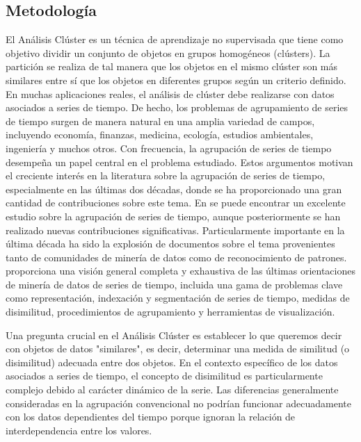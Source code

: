 \documentclass[10pt,a4paper]{article}
\begin{document}
\subsection{Metodología}
El Análisis Clúster es un técnica de aprendizaje no supervisada que tiene como objetivo dividir un conjunto de objetos en grupos homogéneos (clústers). La partición se realiza de tal manera que los objetos en el mismo clúster son más similares entre sí que los objetos en diferentes grupos según un criterio definido. En muchas aplicaciones reales, el análisis de clúster debe realizarse con datos asociados a  series de tiempo. De hecho, los problemas de agrupamiento de series de tiempo surgen de manera natural en una amplia variedad de campos, incluyendo economía, finanzas, medicina, ecología, estudios ambientales, ingeniería y muchos otros. 
Con frecuencia, la agrupación de series de tiempo desempeña un papel central en el problema estudiado. Estos argumentos motivan el creciente interés en la literatura sobre la agrupación de series de tiempo, especialmente en las últimas dos décadas, donde se ha proporcionado una gran cantidad de contribuciones sobre este tema. En \cite{liao2005clustering} se puede encontrar un excelente estudio sobre la agrupación de series de tiempo, aunque posteriormente se han realizado nuevas contribuciones significativas. Particularmente importante en la última década ha sido la explosión de documentos sobre el tema provenientes tanto de comunidades de minería de datos como de reconocimiento de patrones. \cite{fu2011review} proporciona una visión general completa y exhaustiva de las últimas orientaciones de minería de datos de series de tiempo, incluida una gama de problemas clave como representación, indexación y segmentación de series de tiempo, medidas de disimilitud, procedimientos de agrupamiento y herramientas de visualización.

Una pregunta crucial en el Análisis Clúster es establecer lo que queremos decir con objetos de datos "similares", es decir, determinar una medida de similitud (o disimilitud) adecuada entre dos objetos. En el contexto específico de los datos asociados a series de tiempo, el concepto de disimilitud es particularmente complejo debido al carácter dinámico de la serie. Las diferencias generalmente consideradas en la agrupación convencional no podrían funcionar adecuadamente con los datos dependientes del tiempo porque ignoran la relación de interdependencia entre los valores. 
\end{document}
